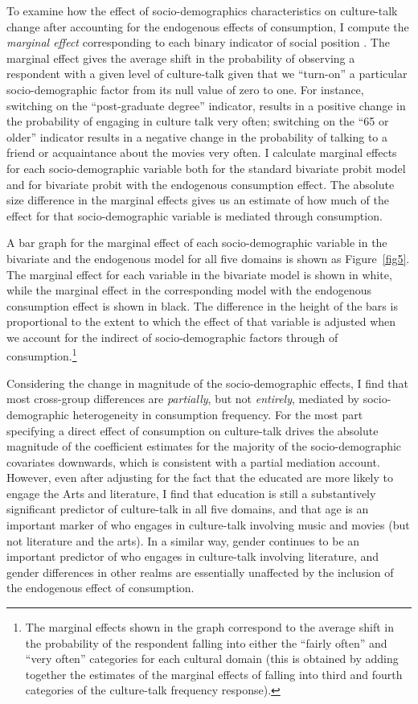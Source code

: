 \documentclass[11pt]{article}
\begin{document}
To examine how the effect of socio-demographics characteristics on culture-talk change after accounting for the endogenous effects of consumption, I compute the \emph{marginal effect} corresponding to each binary indicator of social position \citep{[126]long_freese06}.  The marginal effect gives the average shift in the probability of observing a respondent with a given level of culture-talk given that we ``turn-on'' a particular socio-demographic factor from its null value of zero to one.  For instance, switching on the ``post-graduate degree'' indicator, results in a positive change in the probability of engaging in culture talk very often; switching on the ``65 or older'' indicator results in a negative change in the probability of talking to a friend or acquaintance about the movies very often.  I calculate marginal effects for each socio-demographic variable both for the standard bivariate probit model and for bivariate probit with the endogenous consumption effect.  The absolute size difference in the marginal effects gives us an estimate of how much of the effect for that socio-demographic variable is mediated through consumption.  

A bar graph for the marginal effect of each socio-demographic variable in the bivariate and the endogenous model for all five domains is shown as Figure~\ref{fig5}.  The marginal effect for each variable in the bivariate model is shown in white, while the marginal effect in the corresponding model with the endogenous consumption effect is shown in black.  The difference in the height of the bars is proportional to the extent to which the effect of that variable is adjusted when we account for the indirect of socio-demographic factors through of consumption.\footnote{The marginal effects shown in the graph correspond to the average shift in the probability of the respondent falling into either the ``fairly often'' and ``very often'' categories for each cultural domain (this is obtained by adding together the estimates of the marginal effects of falling into third and fourth categories of the culture-talk frequency response).}

Considering the change in magnitude of the socio-demographic effects, I find that most cross-group differences are\emph{ partially}, but not \emph{entirely}, mediated by socio-demographic heterogeneity in consumption frequency.  For the most part specifying a direct effect of consumption on culture-talk drives the absolute magnitude of the coefficient estimates for the majority of the socio-demographic covariates downwards, which is consistent with a partial mediation account.  However, even after adjusting for the fact that the educated are more likely to engage the Arts and literature, I find that education is still a substantively significant predictor of culture-talk in all five domains, and that age is an important marker of who engages in culture-talk involving music and movies (but not literature and the arts). In a similar way, gender continues to be an important predictor of who engages in culture-talk involving literature, and gender differences in other realms are essentially unaffected by the inclusion of the endogenous effect of consumption.   
\end{document}
